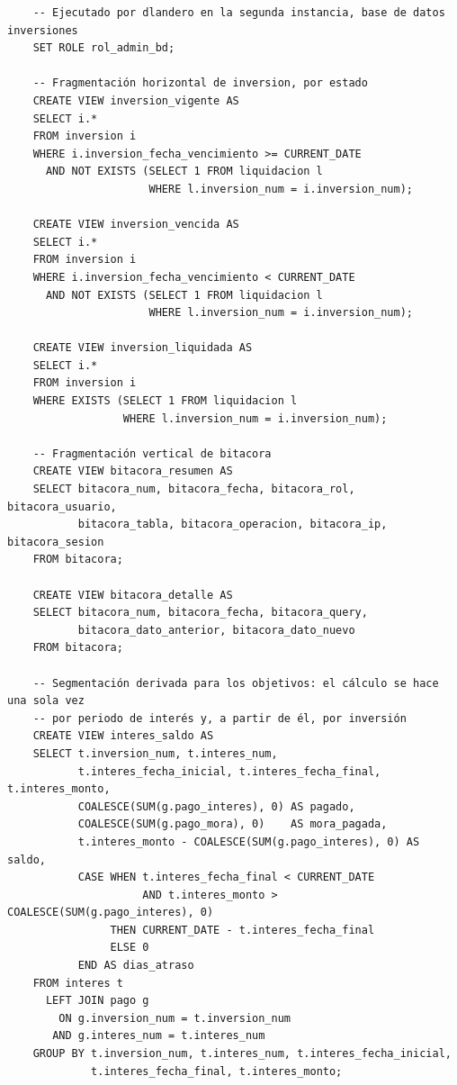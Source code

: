 \begin{verbatim}
	-- Ejecutado por dlandero en la segunda instancia, base de datos inversiones
	SET ROLE rol_admin_bd;

	-- Fragmentación horizontal de inversion, por estado
	CREATE VIEW inversion_vigente AS
	SELECT i.*
	FROM inversion i
	WHERE i.inversion_fecha_vencimiento >= CURRENT_DATE
	  AND NOT EXISTS (SELECT 1 FROM liquidacion l
	                  WHERE l.inversion_num = i.inversion_num);

	CREATE VIEW inversion_vencida AS
	SELECT i.*
	FROM inversion i
	WHERE i.inversion_fecha_vencimiento < CURRENT_DATE
	  AND NOT EXISTS (SELECT 1 FROM liquidacion l
	                  WHERE l.inversion_num = i.inversion_num);

	CREATE VIEW inversion_liquidada AS
	SELECT i.*
	FROM inversion i
	WHERE EXISTS (SELECT 1 FROM liquidacion l
	              WHERE l.inversion_num = i.inversion_num);

	-- Fragmentación vertical de bitacora
	CREATE VIEW bitacora_resumen AS
	SELECT bitacora_num, bitacora_fecha, bitacora_rol, bitacora_usuario,
	       bitacora_tabla, bitacora_operacion, bitacora_ip, bitacora_sesion
	FROM bitacora;

	CREATE VIEW bitacora_detalle AS
	SELECT bitacora_num, bitacora_fecha, bitacora_query,
	       bitacora_dato_anterior, bitacora_dato_nuevo
	FROM bitacora;

	-- Segmentación derivada para los objetivos: el cálculo se hace una sola vez
	-- por periodo de interés y, a partir de él, por inversión
	CREATE VIEW interes_saldo AS
	SELECT t.inversion_num, t.interes_num,
	       t.interes_fecha_inicial, t.interes_fecha_final, t.interes_monto,
	       COALESCE(SUM(g.pago_interes), 0) AS pagado,
	       COALESCE(SUM(g.pago_mora), 0)    AS mora_pagada,
	       t.interes_monto - COALESCE(SUM(g.pago_interes), 0) AS saldo,
	       CASE WHEN t.interes_fecha_final < CURRENT_DATE
	                 AND t.interes_monto > COALESCE(SUM(g.pago_interes), 0)
	            THEN CURRENT_DATE - t.interes_fecha_final
	            ELSE 0
	       END AS dias_atraso
	FROM interes t
	  LEFT JOIN pago g
	    ON g.inversion_num = t.inversion_num
	   AND g.interes_num = t.interes_num
	GROUP BY t.inversion_num, t.interes_num, t.interes_fecha_inicial,
	         t.interes_fecha_final, t.interes_monto;


\end{verbatim}
